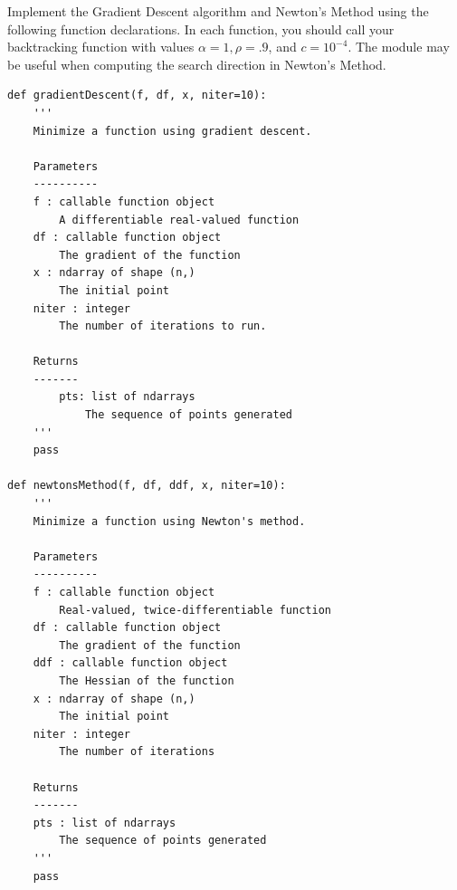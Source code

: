 \begin{problem}
Implement the Gradient Descent algorithm and Newton's Method using the following function declarations.
In each function, you should call your backtracking function with
values $\alpha = 1, \rho = .9$, and $c = 10^{-4}$. The  module
may be useful when computing the search direction in Newton's Method.
\begin{lstlisting}
def gradientDescent(f, df, x, niter=10):
    '''
    Minimize a function using gradient descent.
    
    Parameters
    ----------
    f : callable function object 
        A differentiable real-valued function
    df : callable function object 
        The gradient of the function
    x : ndarray of shape (n,) 
        The initial point
    niter : integer 
        The number of iterations to run.
    
    Returns
    -------
        pts: list of ndarrays 
            The sequence of points generated
    '''
    pass

def newtonsMethod(f, df, ddf, x, niter=10):
    '''
    Minimize a function using Newton's method.
    
    Parameters
    ----------
    f : callable function object
        Real-valued, twice-differentiable function
    df : callable function object
        The gradient of the function
    ddf : callable function object 
        The Hessian of the function
    x : ndarray of shape (n,) 
        The initial point
    niter : integer 
        The number of iterations
        
    Returns
    -------
    pts : list of ndarrays
        The sequence of points generated
    '''
    pass
\end{lstlisting}

\end{problem}

